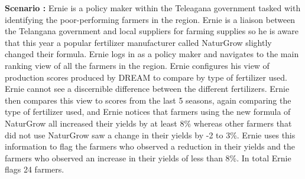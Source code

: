 \begin{flushleft}
\textbf{Scenario :} 
Ernie is a policy maker within the Teleagana government tasked with identifying the poor-performing farmers in the region. Ernie is a liaison between the Telangana government and local suppliers for farming supplies so he is aware that this year a popular fertilizer manufacturer called NaturGrow slightly changed their formula. Ernie logs in as a policy maker and navigates to the main ranking view of all the farmers in the region. Ernie configures his view of production scores produced by DREAM to compare by type of fertilizer used. Ernie cannot see a discernible difference between the different fertilizers. Ernie then compares this view to scores from the last 5 seasons, again comparing the type of fertilizer used, and Ernie notices that farmers using the new formula of NaturGrow all increased their yields by at least 8\% whereas other farmers that did not use NaturGrow saw a change in their yields by -2 to 3\%. Ernie uses this information to flag the farmers who observed a reduction in their yields and the farmers who observed an increase in their yields of less than 8\%. In total Ernie flags 24 farmers. 
\end{flushleft}
